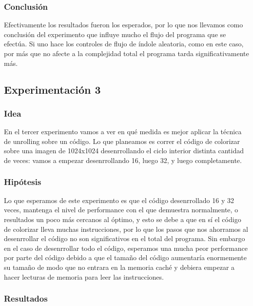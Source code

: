 \medskip

\subsubsection{Conclusión}
\par{Efectivamente los resultados fueron los esperados, por lo que nos llevamos como conclusión del experimento que influye mucho el flujo del programa que se efectúa. Si uno hace los controles de flujo de índole aleatoria, como en este caso, por más que no afecte a la complejidad total el programa tarda significativamente más.}

\subsection{Experimentación 3}

\subsubsection{Idea}
\par{En el tercer experimento vamos a ver en qué medida es mejor aplicar la técnica de unrolling sobre un código. Lo que planeamos es correr el código de colorizar sobre una imagen de 1024x1024 desenrrollando el ciclo interior distinta cantidad de veces: vamos a empezar desenrrollando 16, luego 32, y luego completamente.}

	   
\subsubsection{Hipótesis}
\par{Lo que esperamos de este experimento es que el código desenrrollado 16 y 32 veces, mantenga el nivel de performance con el que demuestra normalmente, o resultados un poco más cercanos al óptimo, y esto se debe a que en sí el código de colorizar lleva muchas instrucciones, por lo que los pasos que nos ahorramos al desenrrollar el código no son significativos en el total del programa. Sin embargo en el caso de desenrrollar todo el código, esperamos una mucha peor performance por parte del código debido a que el tamaño del código aumentaría enormemente su tamaño de modo que no entrara en la memoria caché y debiera empezar a hacer lecturas de memoria para leer las instrucciones.}
	
\subsubsection{Resultados}


